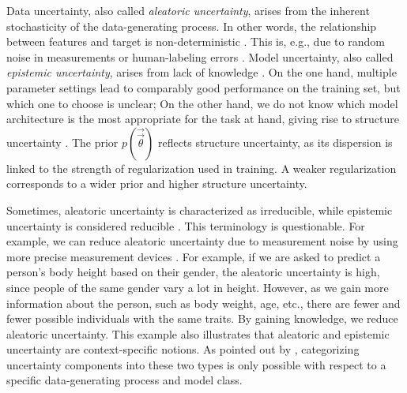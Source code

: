 Data uncertainty, also called \emph{aleatoric uncertainty}, arises from the inherent stochasticity of the data-generating process. In other words, the relationship between features and target is non-deterministic \citep{hullermeierAleatoricEpistemicUncertainty2021}. This is, e.g., due to random noise in measurements or human-labeling errors \citep{gawlikowskiSurveyUQ2023}. Model uncertainty, also called \emph{epistemic uncertainty}, arises from lack of knowledge \citep{hullermeierAleatoricEpistemicUncertainty2021}. On the one hand, multiple parameter settings lead to comparably good performance on the training set, but which one to choose is unclear; On the other hand, we do not know which model architecture is the most appropriate for the task at hand, giving rise to structure uncertainty \citep{galUncertaintyTypes2016}. The prior $p(\vec{\vec{\theta}})$ reflects structure uncertainty, as its dispersion is linked to the strength of regularization used in training. A weaker regularization corresponds to a wider prior and higher structure uncertainty.

Sometimes, aleatoric uncertainty is characterized as irreducible, while epistemic uncertainty is considered reducible \citep{hullermeierAleatoricEpistemicUncertainty2021}. This terminology is questionable. For example, we can reduce aleatoric uncertainty due to measurement noise by using more precise measurement devices \citep{galUncertaintyTypes2016}. For example, if we are asked to predict a person's body height based on their gender, the aleatoric uncertainty is high, since people of the same gender vary a lot in height. However, as we gain more information about the person, such as body weight, age, etc., there are fewer and fewer possible individuals with the same traits. By gaining knowledge, we reduce aleatoric uncertainty. This example also illustrates that aleatoric and epistemic uncertainty are context-specific notions. As pointed out by \cite{hullermeierAleatoricEpistemicUncertainty2021}, categorizing uncertainty components into these two types is only possible with respect to a specific data-generating process and model class.

